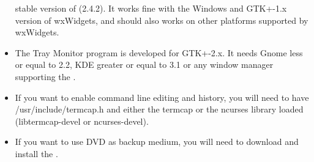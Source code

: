 \begin{itemize}
   stable version of 
    (2.4.2).  It works fine with the
Windows and GTK+-1.x version of wxWidgets, and should  also works on other
platforms supported by wxWidgets. 
\item The Tray Monitor program is developed for GTK+-2.x. It needs  Gnome less
   or equal to 2.2, KDE greater or equal to 3.1 or any window manager supporting
   the  
. 
\item If you want to enable command line editing and history, you will  need
   to have /usr/include/termcap.h and either the termcap or the  ncurses library
   loaded (libtermcap-devel or ncurses-devel). 
\item If you want to use DVD as backup medium, you will need to download  and
   install the  
   . 
\end{itemize}
